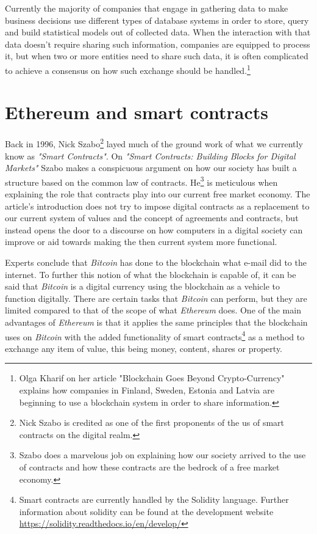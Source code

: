 \documentclass[submission,copyright,creativecommons]{eptcs}
\begin{document}
Currently the majority of companies that engage in gathering data to make business decisions use different types of database systems in order to store, query and build statistical models out of collected data.  When the interaction with that data doesn't require sharing such information, companies are equipped to process it, but when two or more entities\cite{BlockchainGoesCryptoCurrency2016} need to share such data, it is often complicated to achieve a consensus on how such exchange should be handled.\footnote{Olga Kharif on her article "Blockchain Goes Beyond Crypto-Currency" explains how companies in Finland, Sweden, Estonia and Latvia are beginning to use a blockchain system in order to share information.}

\section{Ethereum and smart contracts}
Back in 1996, Nick Szabo\footnote{Nick Szabo is credited as one of the first proponents of the us of smart contracts on the digital realm.} layed much of the ground work of what we currently know as \textit{"Smart Contracts"}.  On \textit{"Smart Contracts: Building Blocks for Digital Markets"}\cite{NickSzaboSmart} Szabo makes a conspicuous argument on how our society has built a structure based on the common law of contracts.  He\footnote{Szabo does a marvelous job on explaining how our society arrived to the use of contracts and how these contracts are the bedrock of a free market economy.} is meticulous when explaining the role that contracts play into our current free market economy.  The article's introduction does not try to impose digital contracts as a replacement to our current system of values and the concept of agreements and contracts, but instead opens the door to a discourse on how computers in a digital society can improve or aid towards making the then current system more functional.

Experts conclude that \textit{Bitcoin} has done to the blockchain what e-mail did to the internet.  To further this notion of what the blockchain is capable of, it can be said that \textit{Bitcoin} is a digital currency using the blockchain as a vehicle to function digitally.  There are certain tasks that \textit{Bitcoin} can perform, but they are limited compared to that of the scope of what \textit{Ethereum} does.  One of the main advantages of \textit{Ethereum} is that it applies the same principles that the blockchain uses on \textit{Bitcoin} with the added functionality of smart contracts\footnote{Smart contracts are currently handled by the Solidity language.  Further information about solidity can be found at the development website \url{https://solidity.readthedocs.io/en/develop/}\cite{SoliditySolidity23}} as a method to exchange any item of value, this being money, content, shares or property.
\end{document}
